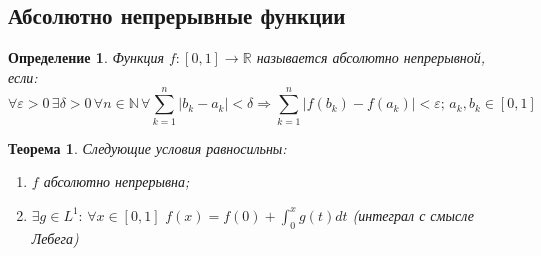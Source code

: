 \documentclass[12pt,a4paper]{article} %
\newtheorem{theorem}{Теорема}
\newtheorem{definition}{Определение}
\newcommand{\R}{\mathbb{R}}
\begin{document}
	\subsection{Абсолютно непрерывные функции}
	\begin{definition}
		Функция $f:[0,1]\rightarrow\R$ называется абсолютно непрерывной, если:
		$$\forall\varepsilon>0\,\exists\delta>0\,\forall n\in\mathbb{N}\,\forall\sum_{k=1}^n|b_k-a_k|<\delta\Rightarrow\sum_{k=1}^n|f(b_k)-f(a_k)|<\varepsilon;\,a_k,b_k\in[0,1]$$
	\end{definition}
	\begin{theorem}
		Следующие условия равносильны:
		\begin{enumerate}
			\item $f$ абсолютно непрерывна;
			\item $\exists g\in L^1:\,\forall x\in[0,1]\,\,f(x)=f(0)+\displaystyle\int_0^xg(t)dt$ (интеграл с смысле Лебега)
		\end{enumerate}
	\end{theorem}
\end{document}

